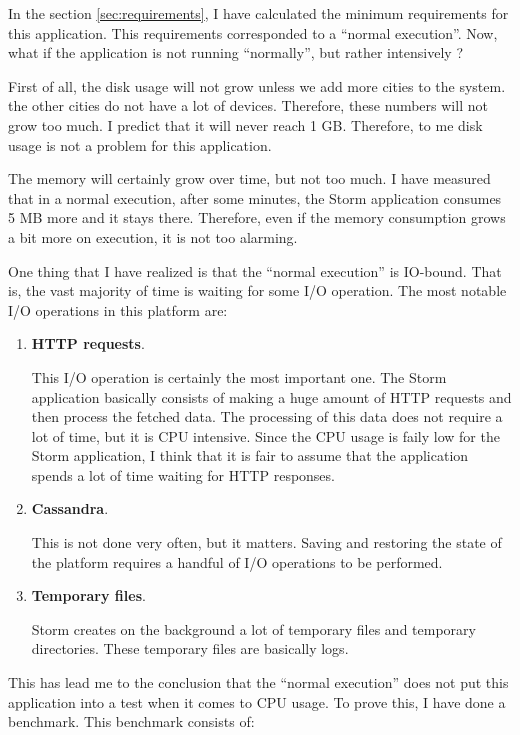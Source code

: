 In the section \ref{sec:requirements}, I have calculated the minimum
requirements for this application. This requirements corresponded to a ``normal
execution''. Now, what if the application is not running ``normally'', but
rather intensively ?

First of all, the disk usage will not grow unless we add more cities to the
system. the other cities do not have a lot of devices. Therefore, these numbers
will not grow too much. I predict that it will never reach 1 GB. Therefore, to
me disk usage is not a problem for this application.

The memory will certainly grow over time, but not too much. I have measured
that in a normal execution, after some minutes, the Storm application consumes
5 MB more and it stays there. Therefore, even if the memory consumption grows a
bit more on execution, it is not too alarming.

One thing that I have realized is that the ``normal execution'' is
IO-bound. That is, the vast majority of time is waiting for some I/O operation.
The most notable I/O operations in this platform are:

\begin{enumerate}
  \itemsep0em
  \item {\bf HTTP requests}.

  This I/O operation is certainly the most important one. The Storm application
basically consists of making a huge amount of HTTP requests and then process the
fetched data. The processing of this data does not require a lot of time, but it
is CPU intensive. Since the CPU usage is faily low for the Storm application, I
think that it is fair to assume that the application spends a lot of time
waiting for HTTP responses.
  \item {\bf Cassandra}.

  This is not done very often, but it matters. Saving and restoring the state of
the platform requires a handful of I/O operations to be performed.
  \item {\bf Temporary files}.

  Storm creates on the background a lot of temporary files and temporary
directories. These temporary files are basically logs.
\end{enumerate}

This has lead me to the conclusion that the ``normal execution'' does not put
this application into a test when it comes to CPU usage. To prove this, I have
done a benchmark. This benchmark consists of:

